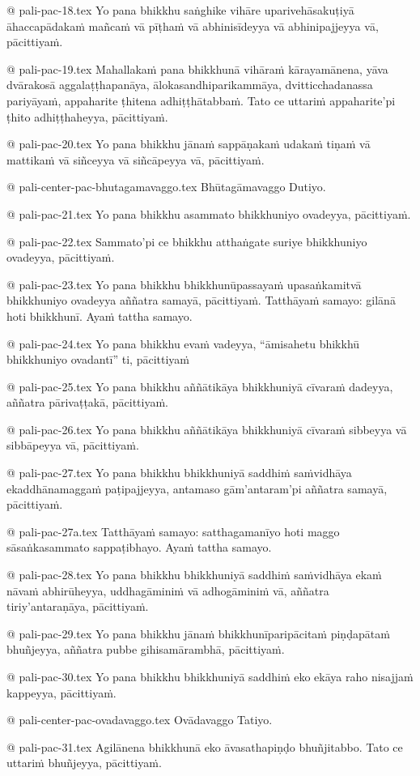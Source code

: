 @ pali-pac-18.tex
Yo pana bhikkhu saṅghike vihāre uparivehāsakuṭiyā āhaccapādakaṁ mañcaṁ vā pīṭhaṁ vā abhinisīdeyya vā abhinipajjeyya vā, pācittiyaṁ.

@ pali-pac-19.tex
Mahallakaṁ pana bhikkhunā vihāraṁ kārayamānena, yāva dvārakosā aggalaṭṭhapanāya, ālokasandhiparikammāya, dvitticchadanassa pariyāyaṁ, appaharite ṭhitena adhiṭṭhātabbaṁ. Tato ce uttariṁ appaharite’pi ṭhito adhiṭṭhaheyya, pācittiyaṁ.

@ pali-pac-20.tex
Yo pana bhikkhu jānaṁ sappāṇakaṁ udakaṁ tiṇaṁ vā mattikaṁ vā siñceyya vā siñcāpeyya vā, pācittiyaṁ.

@ pali-center-pac-bhutagamavaggo.tex
Bhūtagāmavaggo Dutiyo.

@ pali-pac-21.tex
Yo pana bhikkhu asammato bhikkhuniyo ovadeyya, pācittiyaṁ.

@ pali-pac-22.tex
Sammato’pi ce bhikkhu atthaṅgate suriye bhikkhuniyo ovadeyya, pācittiyaṁ.

@ pali-pac-23.tex
Yo pana bhikkhu bhikkhunūpassayaṁ upasaṅkamitvā bhikkhuniyo ovadeyya aññatra samayā, pācittiyaṁ. Tatthāyaṁ samayo: gilānā hoti bhikkhunī. Ayaṁ tattha samayo.

@ pali-pac-24.tex
Yo pana bhikkhu evaṁ vadeyya, “āmisahetu bhikkhū bhikkhuniyo ovadantī” ti, pācittiyaṁ

@ pali-pac-25.tex
Yo pana bhikkhu aññātikāya bhikkhuniyā cīvaraṁ dadeyya, aññatra pārivaṭṭakā, pācittiyaṁ.

@ pali-pac-26.tex
Yo pana bhikkhu aññātikāya bhikkhuniyā cīvaraṁ sibbeyya vā sibbāpeyya vā, pācittiyaṁ.

@ pali-pac-27.tex
Yo pana bhikkhu bhikkhuniyā saddhiṁ saṁvidhāya ekaddhānamaggaṁ paṭipajjeyya, antamaso gām’antaram’pi aññatra samayā, pācittiyaṁ. 

@ pali-pac-27a.tex
Tatthāyaṁ samayo: satthagamanīyo hoti maggo sāsaṅkasammato sappaṭibhayo. Ayaṁ tattha samayo.

@ pali-pac-28.tex
Yo pana bhikkhu bhikkhuniyā saddhiṁ saṁvidhāya ekaṁ nāvaṁ abhirūheyya, uddhagāminiṁ vā adhogāminiṁ vā, aññatra tiriy’antaraṇāya, pācittiyaṁ.

@ pali-pac-29.tex
Yo pana bhikkhu jānaṁ bhikkhunīparipācitaṁ piṇḍapātaṁ bhuñjeyya, aññatra pubbe gihisamārambhā, pācittiyaṁ.

@ pali-pac-30.tex
Yo pana bhikkhu bhikkhuniyā saddhiṁ eko ekāya raho nisajjaṁ kappeyya, pācittiyaṁ.

@ pali-center-pac-ovadavaggo.tex
Ovādavaggo Tatiyo.

@ pali-pac-31.tex
Agilānena bhikkhunā eko āvasathapiṇḍo bhuñjitabbo. Tato ce uttariṁ bhuñjeyya, pācittiyaṁ.

